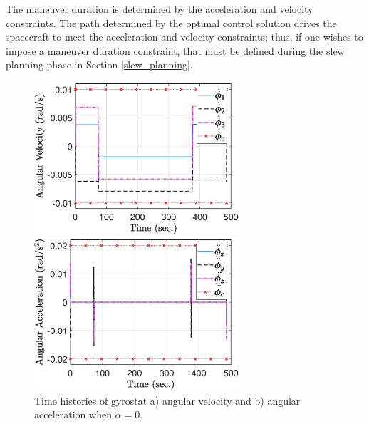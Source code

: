 \documentclass[journal ]{new-aiaa}
\begin{document}
The maneuver duration is determined by the acceleration and velocity constraints. The path determined by the optimal control solution drives the spacecraft to meet the acceleration and velocity constraints; thus, if one wishes to impose a maneuver duration constraint, that must be defined during the slew planning phase in Section \ref{slew_planning}. 

\begin{figure}[htb!]
    \centering
    \begin{minipage}{.5\textwidth}
        \centering
  \includegraphics[width=3in]{figures/alpha0/ang_vel.eps}
    \end{minipage}%
    \begin{minipage}{0.5\textwidth}
        \centering
       \includegraphics[width=3in]{figures/alpha0/ang_accel.eps}
    \end{minipage}
    \caption{Time histories of gyrostat a) angular velocity and b) angular acceleration when $\alpha=0$.}
    \label{fig:ang_vel_acc0} 
\end{figure}
\end{document}
